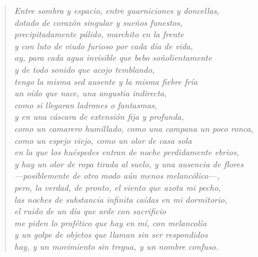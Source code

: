 \documentclass[12pt]{article}
\begin{document}
\clearpage
{}
\begin{verse}

\emph{Entre sombra y espacio, entre guarniciones y doncellas,\\
dotado de corazón singular y sueños funestos,\\
precipitadamente pálido, marchito en la frente\\
y con luto de viudo furioso por cada día de vida,\\
ay, para cada agua invisible que bebo soñolientamente\\
y de todo sonido que acojo temblando,\\
tengo la misma sed ausente y la misma fiebre fría\\
un oído que nace, una angustia indirecta,\\
como si llegaran ladrones o fantasmas,\\
y en una cáscara de extensión fija y profunda,\\
como un camarero humillado, como una campana un poco ronca,\\
como un espejo viejo, como un olor de casa sola\\
en la que los huéspedes entran de noche perdidamente ebrios,\\
y hay un olor de ropa tirada al suelo, y una ausencia de flores\\
—posiblemente de otro modo aún menos melancólico—,\\
pero, la verdad, de pronto, el viento que azota mi pecho,\\
las noches de substancia infinita caídas en mi dormitorio,\\
el ruido de un día que arde con sacrificio\\
me piden lo profético que hay en mí, con melancolía\\
y un golpe de objetos que llaman sin ser respondidos\\
hay, y un movimiento sin tregua, y un nombre confuso.}

\end{verse}
\end{document}
